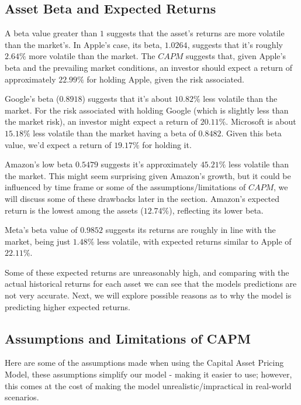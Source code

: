 \documentclass[a4paper,12pt,titlepage]{article}
\numberwithin{equation}{section}
\begin{document}
\subsection{Asset Beta and Expected Returns}

A beta value greater than $1$ suggests that the asset's returns are more volatile than the market's. In Apple's case, 
its beta, $1.0264$, suggests that it's roughly $2.64\%$ more volatile than the market. The $CAPM$ suggests that, given 
Apple's beta and the prevailing market conditions, an investor should expect a return of approximately $22.99\%$ for holding 
Apple, given the risk associated.\newline \par \noindent Google's beta ($0.8918$) suggests that it's about $10.82\%$ 
less volatile than the market. For the risk associated with holding Google (which is slightly less than the market risk), 
an investor might expect a return of $20.11\%$. Microsoft is about $15.18\%$ less volatile than 
the market having a beta of $0.8482$. Given this beta value, we'd expect a return of $19.17\%$ for 
holding it. \newline \par \noindent Amazon's low beta $0.5479$ suggests it's approximately $45.21\%$ less volatile than the 
market. This might seem surprising given Amazon's growth, but it could be influenced by time frame or some of the 
assumptions/limitations of $CAPM$, we will discuss some of these drawbacks later in the section. Amazon's expected return 
is the lowest among the assets ($12.74\%$), reflecting its lower beta. \newline \par \noindent Meta's beta value of $0.9852$ 
suggests its returns are roughly in line with the market, being just $1.48\%$ less volatile, with expected returns similar to Apple 
of $22.11\%$. \newline \par \noindent Some of these expected returns are unreasonably high, and comparing with the actual historical returns
for each asset we can see that the models predictions are not very accurate. Next, we will explore possible reasons as to why the model is 
predicting higher expected returns.

\subsection{Assumptions and Limitations of CAPM}

	Here are some of the assumptions made when using the Capital Asset Pricing Model, these assumptions
	simplify our model - making it easier to use; however, this comes at the cost of making the model 
	unrealistic/impractical in real-world scenarios. 
\end{document}
